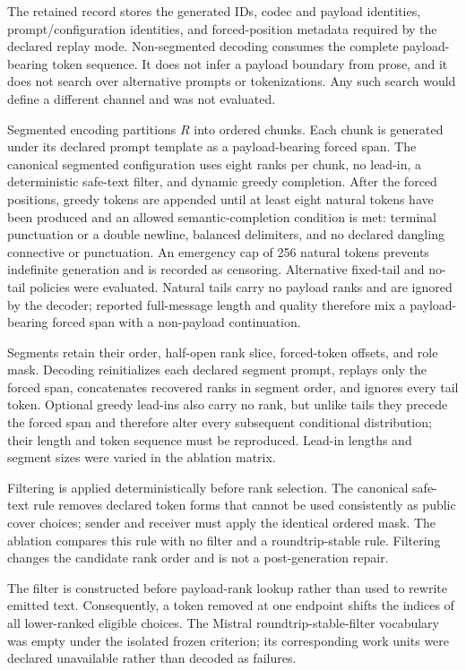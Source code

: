 \documentclass[fleqn,10pt]{wlscirep}
\begin{document}
The retained record stores the generated IDs, codec and payload identities, prompt/configuration identities, and forced-position metadata required by the declared replay mode. Non-segmented decoding consumes the complete payload-bearing token sequence. It does not infer a payload boundary from prose, and it does not search over alternative prompts or tokenizations. Any such search would define a different channel and was not evaluated.

Segmented encoding partitions \(R\) into ordered chunks. Each chunk is generated under its declared prompt template as a payload-bearing forced span. The canonical segmented configuration uses eight ranks per chunk, no lead-in, a deterministic safe-text filter, and dynamic greedy completion. After the forced positions, greedy tokens are appended until at least eight natural tokens have been produced and an allowed semantic-completion condition is met: terminal punctuation or a double newline, balanced delimiters, and no declared dangling connective or punctuation. An emergency cap of 256 natural tokens prevents indefinite generation and is recorded as censoring. Alternative fixed-tail and no-tail policies were evaluated. Natural tails carry no payload ranks and are ignored by the decoder; reported full-message length and quality therefore mix a payload-bearing forced span with a non-payload continuation.

Segments retain their order, half-open rank slice, forced-token offsets, and role mask. Decoding reinitializes each declared segment prompt, replays only the forced span, concatenates recovered ranks in segment order, and ignores every tail token. Optional greedy lead-ins also carry no rank, but unlike tails they precede the forced span and therefore alter every subsequent conditional distribution; their length and token sequence must be reproduced. Lead-in lengths and segment sizes were varied in the ablation matrix.

Filtering is applied deterministically before rank selection. The canonical safe-text rule removes declared token forms that cannot be used consistently as public cover choices; sender and receiver must apply the identical ordered mask. The ablation compares this rule with no filter and a roundtrip-stable rule. Filtering changes the candidate rank order and is not a post-generation repair.

The filter is constructed before payload-rank lookup rather than used to rewrite emitted text. Consequently, a token removed at one endpoint shifts the indices of all lower-ranked eligible choices. The Mistral roundtrip-stable-filter vocabulary was empty under the isolated frozen criterion; its corresponding work units were declared unavailable rather than decoded as failures.
\end{document}
